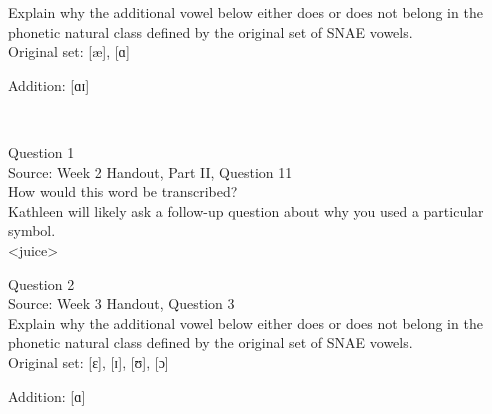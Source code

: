 \documentclass[12pt]{article}
\begin{document}
Explain why the additional vowel below either does or does not belong in the phonetic natural class defined by the original set of SNAE vowels.\\

Original set: {[æ]}, {[ɑ]}

Addition: {[ɑɪ]}


\newpage

\begin{center}
\textbf{{\color{red}{\HUGE END OF EXAM}}}\\

\end{center}
\newpage

\begin{center}
\textbf{{\color{blue}{\HUGE START OF EXAM\\}}}

\textbf{{\color{blue}{\HUGE Student ID: 72428\\}}}

\textbf{{\color{blue}{\HUGE 4:40\\}}}

\end{center}
\newpage

{\large Question 1}\\

Source: Week 2 Handout, Part II, Question 11\\

How would this word be transcribed?\\ Kathleen will likely ask a follow-up question about why you used a particular symbol.\\

<juice>


\newpage

{\large Question 2}\\

Source: Week 3 Handout, Question 3\\

Explain why the additional vowel below either does or does not belong in the phonetic natural class defined by the original set of SNAE vowels.\\

Original set: {[ɛ]}, {[ɪ]}, {[ʊ]}, {[ɔ]}

Addition: {[ɑ]}


\newpage

\begin{center}
\textbf{{\color{red}{\HUGE END OF EXAM}}}\\

\end{center}
\newpage
\end{document}
